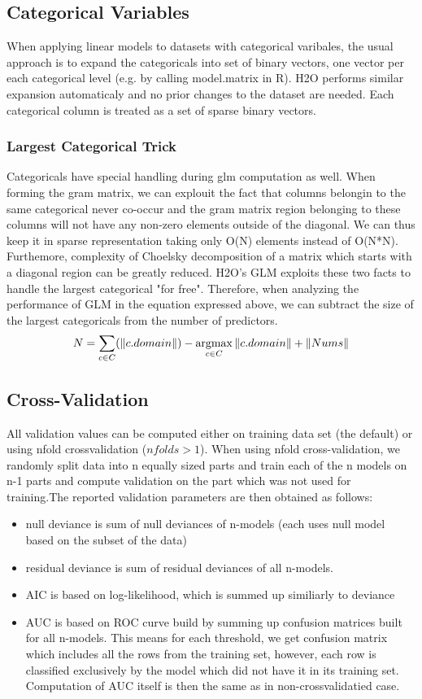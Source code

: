 \documentclass[11pt]{article}
\newcommand{\argmax}{\operatornamewithlimits{argmax}}
\begin{document}
\subsection{Categorical Variables}
When applying linear models to datasets with categorical varibales, the usual approach is to expand the categoricals into set of binary vectors, one vector per each categorical level (e.g. by calling model.matrix in R). H2O performs similar expansion automaticaly and no prior changes to the dataset are needed. Each categorical column is treated as a set of sparse binary vectors.

\subsubsection{Largest Categorical Trick}
Categoricals have special handling during glm computation as well. When forming the gram matrix, we can explouit the fact that columns belongin to the same categorical never co-occur and the gram matrix region belonging to these columns will not have any non-zero elements outside of the diagonal. We can thus keep it in sparse representation taking only O(N) elements instead of O(N*N). Furthemore, complexity of Choelsky decomposition of a matrix which starts with a diagonal region can be greatly reduced. H2O's GLM exploits these two facts to handle the largest categorical "for free". Therefore, when analyzing the performance of GLM in the equation expressed above, we can subtract the size of the largest categoricals from the number of predictors.
\[ N = \sum\limits_{c \in C} (\|c.domain\|) - \argmax\limits_{c \in C} \|c.domain\|  + \| Nums \| \]

\subsection{Cross-Validation}
All validation values can be computed either on training data set (the default) or using nfold crossvalidation ($nfolds > 1$). When using nfold cross-validation, we randomly split data into n equally sized parts and train each of the n models on n-1 parts and compute validation on the part which was not used for training.The reported validation parameters are then obtained as follows:
\begin{itemize} 
\item null deviance is sum of null deviances of n-models (each uses null model based on the subset of the data)
\item residual deviance is sum of residual deviances of all n-models.
\item AIC is based on log-likelihood, which is summed up similiarly to deviance
\item AUC is based on ROC curve build  by summing up confusion matrices built for all n-models.
This means for each threshold, we get confusion matrix which includes all the rows from
the training set, however, each row is classified exclusively by the model
which did not have it in its training set. Computation of AUC itself is then the same as in non-crossvalidatied case. 
\end{itemize}
\end{document}
